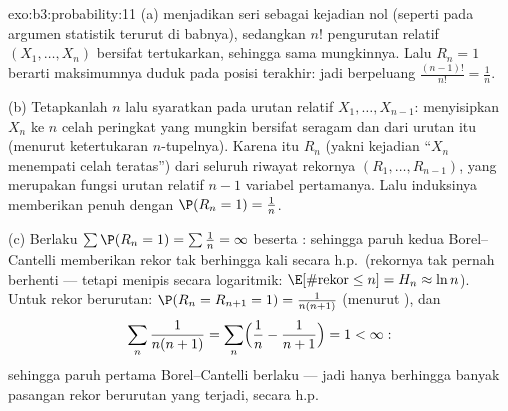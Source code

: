 \begin{solution}{exo:b3:probability:11}
(a)   menjadikan seri sebagai kejadian nol
(seperti pada argumen statistik terurut di babnya), sedangkan
$n!$ pengurutan relatif $(X_1, \dots, X_n)$ bersifat
tertukarkan, sehingga sama mungkinnya. Lalu $R_n = 1$ berarti
maksimumnya duduk pada posisi terakhir: jadi berpeluang
$\frac{(n-1)!}{n!} = \frac1n$.

(b) Tetapkanlah $n$ lalu syaratkan pada urutan relatif $X_1,
\dots, X_{n-1}$: menyisipkan $X_n$ ke $n$ celah peringkat
yang mungkin bersifat seragam dan  dari urutan itu
(menurut ketertukaran $n$-tupelnya). Karena itu $R_n$ (yakni kejadian
``$X_n$ menempati celah teratas'')  dari seluruh
riwayat rekornya $(R_1, \dots, R_{n-1})$, yang merupakan fungsi
urutan relatif $n - 1$ variabel pertamanya.
Lalu induksinya memberikan  penuh dengan $\P(R_n = 1) =
\frac1n$.

(c) Berlaku $\sum\P(R_n = 1) = \sum\frac1n = \infty$ beserta
: sehingga paruh kedua Borel--Cantelli memberikan rekor
tak berhingga kali secara h.p.\ (rekornya tak pernah berhenti --- tetapi
menipis secara logaritmik: $\E[\#\text{rekor} \leq n] =
H_n \approx \ln n$). Untuk rekor berurutan: $\P(R_n = R_{n+1}
= 1) = \frac1{n(n+1)}$ (menurut ), dan
\[
\sum_n\frac1{n(n+1)} = \sum_n\Bigl(\frac1n -
\frac1{n+1}\Bigr) = 1 < \infty :
\]
sehingga paruh pertama Borel--Cantelli berlaku --- jadi hanya berhingga
banyak pasangan rekor berurutan yang terjadi, secara h.p.
\end{solution}

